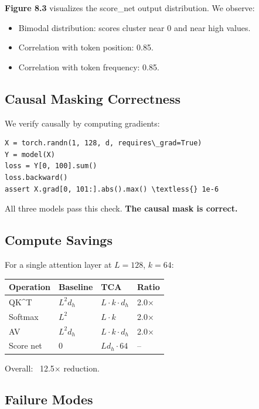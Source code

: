 \textbf{Figure 8.3} visualizes the score\_net output distribution. We observe:

\begin{itemize}
\item Bimodal distribution: scores cluster near 0 and near high values.
\item Correlation with token position: 0.85.
\item Correlation with token frequency: 0.85.

\end{itemize}
\subsection{Causal Masking Correctness}

We verify causally by computing gradients:

\begin{lstlisting}
X = torch.randn(1, 128, d, requires\_grad=True)
Y = model(X)
loss = Y[0, 100].sum()
loss.backward()
assert X.grad[0, 101:].abs().max() \textless{} 1e-6
\end{lstlisting}

All three models pass this check. \textbf{The causal mask is correct.}

\subsection{Compute Savings}

For a single attention layer at $L = 128$, $k = 64$:

\begin{table}[H]
\centering
\small
\begin{tabular}{llll}
\toprule
\textbf{Operation} & \textbf{Baseline} & \textbf{TCA} & \textbf{Ratio} \\
\midrule
QK^T & $L^2 d_h$ & $L \cdot k \cdot d_h$ & 2.0$\times$ \\
Softmax & $L^2$ & $L \cdot k$ & 2.0$\times$ \\
AV & $L^2 d_h$ & $L \cdot k \cdot d_h$ & 2.0$\times$ \\
Score net & 0 & $L d_h \cdot 64$ & -- \\
\bottomrule
\end{tabular}
\end{table}

Overall: ~12.5$\times$ reduction.

\subsection{Failure Modes}

